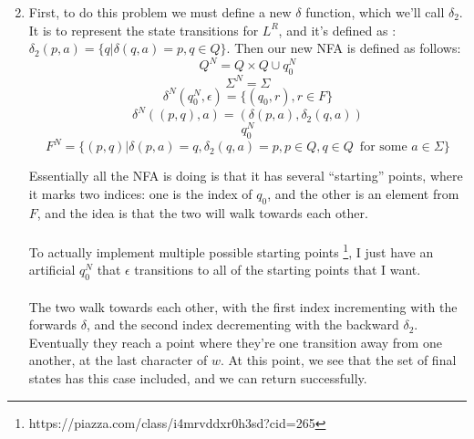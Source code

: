 
\usepackage{amsmath, verbatim, tikz, float}

\usetikzlibrary{arrows,automata}

\oddsidemargin 0in
\evensidemargin 0in
\textwidth 6.5in
\topmargin -0.5in
\textheight 9.0in
\newcommand{\norm}[1]{\left\lVert #1 \right\rVert}


\pagestyle{myheadings}

\begin{enumerate}
  \setcounter{enumi}{1}
\item
  First, to do this problem we must define a new $\delta$ function, which we'll call $\delta_2$. It is to represent the state transitions for $L^R$, and it's defined as : $\delta_2(p,a) = \{q | \delta(q,a) = p, q \in Q\}$. Then our new NFA is defined as follows:
  $$Q^N = Q \times Q \cup q_0^N$$
  $$\Sigma^N = \Sigma$$
  $$\delta^N(q_0^N, \epsilon) = \{(q_0, r), r \in F\}$$
  $$\delta^N((p,q), a) = (\delta(p,a), \delta_2(q,a))$$
  $$q_0^N$$
  $$F^N = \{(p,q) | \delta(p,a) = q, \delta_2(q,a) = p, p \in Q, q \in Q\, \text{ for some } a \in \Sigma\}$$

  Essentially all the NFA is doing is that it has several ``starting'' points, where it marks two indices: one is the index of $q_0$, and the other is an element from $F$, and the idea is that the two will walk towards each other.\\\\
  To actually implement multiple possible starting points \footnote{https://piazza.com/class/i4mrvddxr0h3sd?cid=265}, I just have an artificial $q_0^N$ that $\epsilon$ transitions to all of the starting points that I want.\\\\
  The two walk towards each other, with the first index incrementing with the forwards $\delta$, and the second index decrementing with the backward $\delta_2$. Eventually they reach a point where they're one transition away from one another, at the last character of $w$. At this point, we see that the set of final states has this case included, and we can return successfully.\\
  

\end{enumerate}

